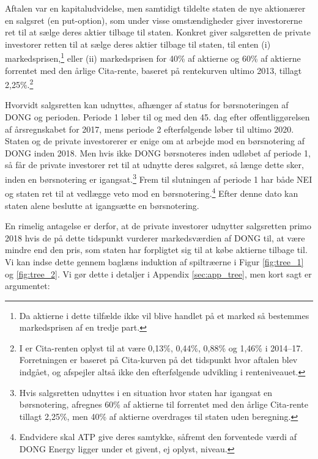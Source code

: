 \documentclass{article}
\begin{document}
Aftalen var en kapitaludvidelse, men samtidigt tildelte staten de nye aktionærer en salgsret (en put-option), som under visse omstændigheder giver investorerne ret til at sælge deres aktier tilbage til staten. Konkret giver salgsretten de private investorer retten til at sælge deres aktier tilbage til staten,  til enten (i) markedsprisen,\footnote{Da aktierne i dette tilfælde ikke vil blive handlet på et marked så bestemmes markedsprisen af en tredje part.} eller (ii) markedsprisen for 40\% af aktierne og 60\% af aktierne forrentet med den årlige Cita-rente, baseret på rentekurven ultimo 2013, tillagt 2,25\%.\footnote{I \citet{FM2013f} er Cita-renten oplyst til at være 0,13\%, 0,44\%, 0,88\% og 1,46\% i 2014--17. Forretningen er baseret på Cita-kurven på det tidspunkt hvor aftalen blev indgået, og afspejler altså ikke den efterfølgende udvikling i renteniveauet.}

Hvorvidt salgsretten kan udnyttes, afhænger af status for børsnoteringen af DONG og perioden. Periode 1 løber til og med den 45. dag efter offentliggørelsen af årsregnskabet for 2017, mens periode 2 efterfølgende løber til ultimo 2020. Staten og de private investorerer er enige om at arbejde mod en børsnotering af DONG inden 2018. Men hvis ikke DONG børsnoteres inden udløbet af periode 1, så får de private investorer ret til at udnytte deres salgsret, så længe dette sker, inden en børsnotering er igangsat.\footnote{Hvis salgsretten udnyttes i en situation hvor staten har igangsat en børsnotering, afregnes 60\% af aktierne til  forrentet med den årlige Cita-rente tillagt 2,25\%, men 40\% af aktierne overdrages til staten uden beregning.} Frem til slutningen af periode 1 har både NEI og staten ret til at vedlægge veto mod en børsnotering.\footnote{Endvidere skal ATP give deres samtykke, såfremt den forventede værdi af DONG Energy ligger under et givent, ej oplyst, niveau.} Efter denne dato kan staten alene beslutte at igangsætte en børsnotering.

En rimelig antagelse er derfor, at de private investorer udnytter salgsretten primo 2018 hvis de på dette tidspunkt vurderer markedsværdien af DONG til, at være mindre end den pris, som staten har forpligtet sig til at købe aktierne tilbage til. Vi kan indse dette gennem baglæns induktion af spiltræerne i Figur \ref{fig:tree_1} og \ref{fig:tree_2}. Vi gør dette i detaljer i Appendix \ref{sec:app_tree}, men kort sagt er argumentet:
\end{document}
